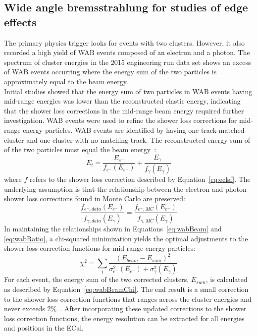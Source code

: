 \subsection{Wide angle bremsstrahlung for studies of edge effects}
The primary physics trigger looks for events with two clusters. However, it also recorded a high yield of WAB events composed of an electron and a photon. The spectrum of cluster energies in the 2015 engineering run data set shows an excess of WAB events occurring where the energy sum of the two particles is approximately equal to the beam energy. \\
\indent Initial studies showed that the energy sum of two particles in WAB events having mid-range energies was lower than the reconstructed elastic energy, indicating that the shower loss corrections in the mid-range beam energy required further investigation. WAB events were used to refine the shower loss corrections for mid-range energy particles. WAB events are identified by having one track-matched cluster and one cluster with no matching track. The reconstructed energy sum of of the two particles must equal the beam energy~\cite{szumila-vance_hps_2016}:
\begin{equation}
	\label{eq:wabBeam}
	E_i = \dfrac{E_{e^-}}{f_{e^-}(E_{e^-})}+\dfrac{E_{\gamma}}{f_{\gamma}(E_{\gamma})}
\end{equation}
where $f$ refers to the shower loss correction described by Equation~\eqref{eq:eclsf}. The underlying assumption is that the relationship between the electron and photon shower loss corrections found in Monte Carlo are preserved:
\begin{equation}
	\label{eq:wabRatio}
	 \dfrac{f_{e^-, data}(E_{e^-})}{f_{\gamma, data}(E_{\gamma})}= \dfrac{f_{e^-, MC}(E_{e^-})}{f_{\gamma, MC}(E_{\gamma})}
\end{equation}
In maintaining the relationships shown in Equations~\eqref{eq:wabBeam} and \eqref{eq:wabRatio}, a chi-squared minimization yields the optimal adjustments to the shower loss correction functions for mid-range energy particles:
\begin{equation}
	\label{eq:wabBeamChi}
	\chi^2 =\sum_{i} \dfrac{(E_{beam}-E_{sum})^2}{\sigma_{e^-}^2(E_{e^-})+\sigma_{\gamma}^2(E_{\gamma})}	
\end{equation}
For each event, the energy sum of the two corrected clusters, $E_{sum}$, is calculated as described by Equation~\eqref{eq:wabBeamChi}. The end result is a small correction to the shower loss correction functions that ranges across the cluster energies and never exceeds 2$\%$~\cite{szumila-vance_hps_2016}. After incorporating these updated corrections to the shower loss correction functions, the energy resolution can be extracted for all energies and positions in the ECal.  

